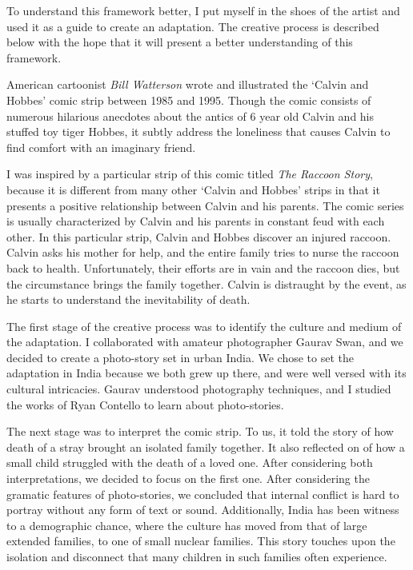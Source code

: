 \documentclass[12pt]{article}
\begin{document}
To understand this framework better, I put myself in the shoes of the artist and
used it as a guide to create an adaptation. The creative process is described
below with the hope that it will present a better understanding of this framework.

American cartoonist \textit{Bill Watterson} wrote and illustrated the `Calvin
and Hobbes' comic strip between 1985 and 1995. Though the comic consists of numerous
hilarious anecdotes about the antics of 6 year old Calvin and his stuffed toy
tiger Hobbes, it subtly address the loneliness that causes Calvin to find
comfort with an imaginary friend.

I was inspired by a particular strip of this comic titled \textit{The Raccoon Story},
because it is different from many other `Calvin and
Hobbes' strips in that it presents a positive relationship between Calvin and
his parents. The comic series is usually characterized by Calvin and his parents in 
constant feud with each other. In this particular strip, Calvin and Hobbes discover an
injured raccoon. Calvin asks his mother for help, and the entire family tries to
nurse the raccoon back to health. Unfortunately, their efforts are in vain 
and the raccoon dies, but the circumstance brings the family together. Calvin is
distraught by the event, as he starts to understand the inevitability of death.

The first stage of the creative process was to identify the culture and medium of
the adaptation. I collaborated with amateur photographer Gaurav Swan, and we
decided to create a photo-story set in urban India. We chose to set the adaptation in India
because we both grew up there, and were well versed with its cultural
intricacies. Gaurav understood photography techniques, and I studied the works 
of Ryan Contello to learn about photo-stories. 

The next stage was to interpret the comic strip. To us, it told the story 
of how death of a stray brought an isolated family together. It also reflected on
of how a small child struggled with the death of a loved one. After
considering both interpretations, we decided to focus on the first one. 
After considering the gramatic features of photo-stories, we concluded that 
internal conflict is hard to portray without any 
form of text or sound. Additionally, India has been witness to a demographic
chance, where the culture has moved from that of large extended 
families, to one of small nuclear families. This story touches upon the
isolation and disconnect that many children in such families often experience.
\end{document}
